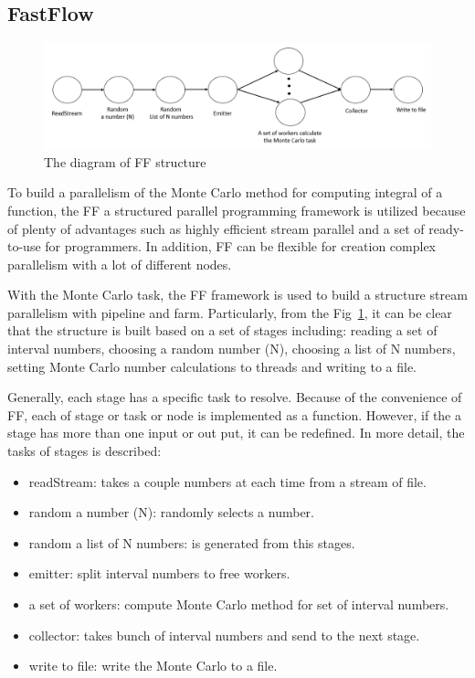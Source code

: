 \documentclass[runningheads,a4paper]{llncs}
\begin{document}
\subsection{FastFlow}
\label{subsec:ff}

\begin{figure}[h!]
	\centering
	\includegraphics[scale = 0.4]{image/ffStructure}	
	\caption{The diagram of FF structure}
	\label{Fig:ffStructure}
\end{figure}

To build a parallelism of the Monte Carlo method for computing integral of a function, the FF a structured parallel programming framework is utilized because of plenty of advantages such as highly efficient stream parallel and a set of ready-to-use for programmers.
In addition, FF can be flexible for creation complex parallelism with a lot of different nodes.


With the Monte Carlo task, the FF framework is used to build a structure stream parallelism with pipeline and farm.
Particularly, from the Fig~\ref{Fig:ffStructure}, it can be clear that the structure is built based on a set of stages including:
reading a set of interval numbers, choosing a random number (N), choosing a list of N numbers, setting Monte Carlo number calculations to threads and writing to a file.

Generally, each stage has a specific task to resolve. 
Because of the convenience of FF, each of stage or task or node is implemented as a function. 
However, if the a stage has more than one input or out put, it can be redefined.
In more detail, the tasks of stages is described:
\begin{itemize}
\item readStream: takes a couple numbers at each time from a stream of file.
\item random a number (N): randomly selects a number.
\item random a list of N numbers: is generated from this stages.
\item emitter: split interval numbers to free workers.
\item a set of workers: compute Monte Carlo method for set of interval numbers.
\item collector: takes bunch of interval numbers and send to the next stage.
\item write to file: write the Monte Carlo to a file.
\end{itemize}
\end{document}
